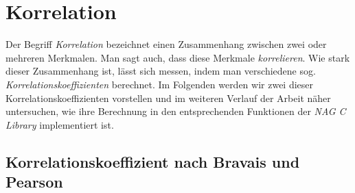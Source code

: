 \documentclass{article}
\begin{document}
\section{Korrelation}

Der Begriff {\it Korrelation} bezeichnet einen Zusammenhang zwischen zwei oder mehreren Merkmalen. Man sagt auch, dass diese Merkmale {\it korrelieren}. Wie stark dieser Zusammenhang ist, lässt sich messen, indem man verschiedene sog. {\it Korrelationskoeffizienten} berechnet. Im Folgenden werden wir zwei dieser Korrelationskoeffizienten vorstellen und im weiteren Verlauf der Arbeit näher untersuchen, wie ihre Berechnung in den entsprechenden Funktionen der {\it NAG C Library} implementiert ist.

\subsection{Korrelationskoeffizient nach Bravais und Pearson}
\end{document}
